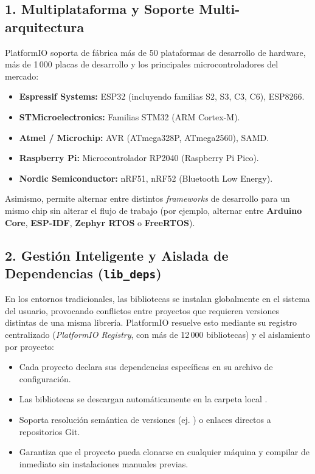 \documentclass[12pt,a4paper]{article}
\begin{document}
\subsection{1. Multiplataforma y Soporte Multi-arquitectura}
PlatformIO soporta de fábrica más de 50 plataformas de desarrollo de hardware, más de 1\,000 placas de desarrollo y los principales microcontroladores del mercado:
\begin{itemize}
    \item \textbf{Espressif Systems:} ESP32 (incluyendo familias S2, S3, C3, C6), ESP8266.
    \item \textbf{STMicroelectronics:} Familias STM32 (ARM Cortex-M).
    \item \textbf{Atmel / Microchip:} AVR (ATmega328P, ATmega2560), SAMD.
    \item \textbf{Raspberry Pi:} Microcontrolador RP2040 (Raspberry Pi Pico).
    \item \textbf{Nordic Semiconductor:} nRF51, nRF52 (Bluetooth Low Energy).
\end{itemize}

Asimismo, permite alternar entre distintos \textit{frameworks} de desarrollo para un mismo chip sin alterar el flujo de trabajo (por ejemplo, alternar entre \textbf{Arduino Core}, \textbf{ESP-IDF}, \textbf{Zephyr RTOS} o \textbf{FreeRTOS}).

\subsection{2. Gestión Inteligente y Aislada de Dependencias (\texttt{lib\_deps})}
En los entornos tradicionales, las bibliotecas se instalan globalmente en el sistema del usuario, provocando conflictos entre proyectos que requieren versiones distintas de una misma librería. PlatformIO resuelve esto mediante su registro centralizado (\textit{PlatformIO Registry}, con más de 12\,000 bibliotecas) y el aislamiento por proyecto:
\begin{itemize}
    \item Cada proyecto declara sus dependencias específicas en su archivo de configuración.
    \item Las bibliotecas se descargan automáticamente en la carpeta local .
    \item Soporta resolución semántica de versiones (ej. ) o enlaces directos a repositorios Git.
    \item Garantiza que el proyecto pueda clonarse en cualquier máquina y compilar de inmediato sin instalaciones manuales previas.
\end{itemize}
\end{document}
